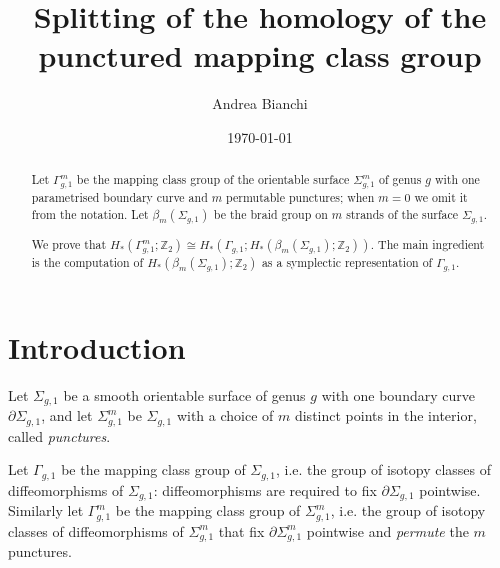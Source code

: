 \documentclass{amsart}
\theoremstyle{plain}
\theoremstyle{definition}
\newcommand{\sgm}{\Sigma_{g,1}^m}
\newcommand{\sg}{\Sigma_{g,1}}
\renewcommand{\gg}{\Gamma_{g,1}}
\newcommand{\ggm}{\gg^m}
\begin{document}
\title{Splitting of the homology of the punctured mapping class group}

\author{Andrea Bianchi}

\address{Mathematics Institute,
University of Bonn,
Endenicher Allee 60, Bonn,
Germany
}




\date{\today}




\begin{abstract}
Let $\Gamma_{g,1}^m$ be the mapping class group of the orientable surface $\Sigma_{g,1}^m$ of genus $g$ with one parametrised
boundary curve and $m$ permutable punctures; when $m=0$ we omit it from the notation.
Let $\beta_{m}(\Sigma_{g,1})$ be the braid group on $m$ strands
of the surface $\Sigma_{g,1}$.

\noindent We prove that $H_*(\Gamma_{g,1}^m;\mathbb{Z}_2)\cong H_*(\Gamma_{g,1};H_*(\beta_{m}(\Sigma_{g,1});\mathbb{Z}_2))$. The main ingredient
is the computation of $H_*(\beta_{m}(\Sigma_{g,1});\mathbb{Z}_2)$ as a symplectic representation of $\Gamma_{g,1}$.
\end{abstract}

\maketitle

\section{Introduction}
Let $\sg$ be a smooth orientable surface of genus $g$ with one boundary curve $\partial\sg$, and let $\sgm$ be $\sg$ with
a choice of $m$ distinct points in the interior, called \emph{punctures}.

Let $\gg$ be the mapping class group of $\sg$, i.e. the group of isotopy classes of diffeomorphisms of $\sg$:
diffeomorphisms are required to fix $\partial\sg$ pointwise. Similarly let $\ggm$ be the mapping class group of $\sgm$, i.e.
the group of isotopy classes of diffeomorphisms of $\sgm$ that fix $\partial\sgm$ pointwise and \emph{permute} the $m$ punctures.
\end{document}
